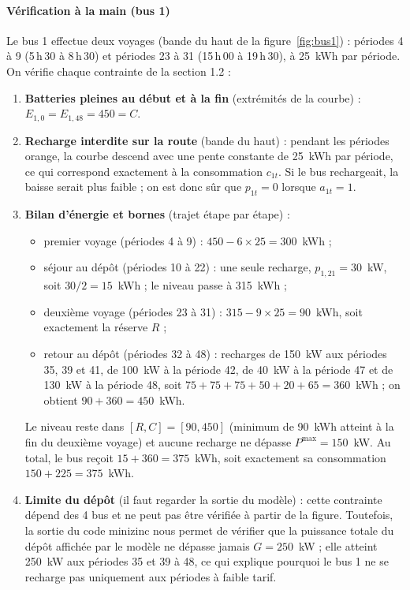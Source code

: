 \documentclass{article}
\begin{document}
\paragraph{Vérification à la main (bus 1)}
Le bus 1 effectue deux voyages (bande du haut de la figure~\ref{fig:bus1}) : périodes 4 à 9 (5\,h\,30 à 8\,h\,30) et périodes 23 à 31 (15\,h\,00 à 19\,h\,30), à 25~kWh par période.
On vérifie chaque contrainte de la section 1.2 :
\begin{enumerate}
  \item[1--2.] \textbf{Batteries pleines au début et à la fin} (extrémités de la courbe) : $E_{1,0} = E_{1,48} = 450 = C$. \checkmark
  \item[3.] \textbf{Recharge interdite sur la route} (bande du haut) : pendant les périodes orange, la courbe descend avec une pente constante de 25~kWh par période, ce qui correspond exactement à la consommation $c_{1t}$. Si le bus rechargeait, la baisse serait plus faible ; on est donc sûr que $p_{1t} = 0$ lorsque $a_{1t} = 1$. \checkmark
  \item[4.] \textbf{Bilan d'énergie et bornes} (trajet étape par étape) :
  \begin{itemize}
    \item premier voyage (périodes 4 à 9) : $450 - 6 \times 25 = 300$~kWh ;
    \item séjour au dépôt (périodes 10 à 22) : une seule recharge, $p_{1,21} = 30$~kW, soit $30/2 = 15$~kWh ; le niveau passe à 315~kWh ;
    \item deuxième voyage (périodes 23 à 31) : $315 - 9 \times 25 = 90$~kWh, soit exactement la réserve $R$ ;
    \item retour au dépôt (périodes 32 à 48) : recharges de 150~kW aux périodes 35, 39 et 41, de 100~kW à la période 42, de 40~kW à la période 47 et de 130~kW à la période 48, soit $75 + 75 + 75 + 50 + 20 + 65 = 360$~kWh ; on obtient $90 + 360 = 450$~kWh.
  \end{itemize}
  Le niveau reste dans $[R, C] = [90, 450]$ (minimum de 90~kWh atteint à la fin du deuxième voyage) et aucune recharge ne dépasse $P^{\max} = 150$~kW. Au total, le bus reçoit $15 + 360 = 375$~kWh, soit exactement sa consommation $150 + 225 = 375$~kWh. \checkmark
  \item[5.] \textbf{Limite du dépôt} (il faut regarder la sortie du modèle) : cette contrainte dépend des 4 bus et ne peut pas être vérifiée à partir de la figure. Toutefois, la sortie du code minizinc nous permet de vérifier que la puissance totale du dépôt affichée par le modèle ne dépasse jamais $G = 250$~kW ; elle atteint 250~kW aux périodes 35 et 39 à 48, ce qui explique pourquoi le bus 1 ne se recharge pas uniquement aux périodes à faible tarif. \checkmark
\end{enumerate}
\end{document}
